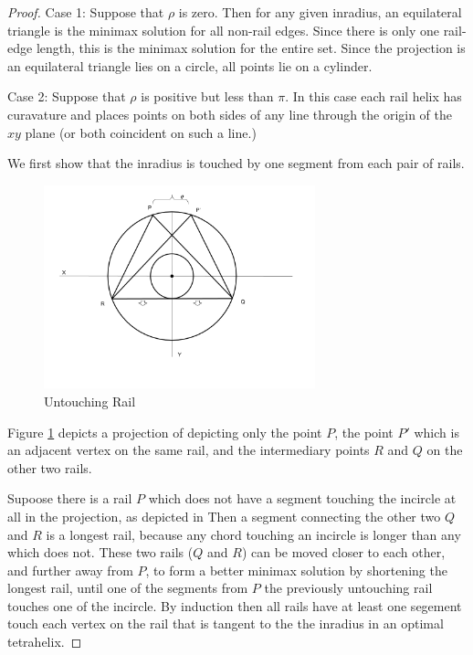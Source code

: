 \documentclass[11pt]{article}
\begin{document}
\begin{proof}



Case 1: Suppose that $\rho$ is zero. Then for any given inradius, an equilateral
triangle is the minimax solution for all non-rail edges. Since there is only
one rail-edge length, this is the minimax solution for the entire set. Since
the projection is an equilateral triangle lies on a circle, all points lie on
a cylinder.

Case 2: Suppose that $\rho$ is positive but less than $\pi$.
In this case each rail helix has
curavature and places points on both sides of any line through the origin
of the $xy$ plane (or both coincident on such a line.)

We first show that the inradius is touched by one segment from each pair
of rails.

\begin{figure}[H]
  \label{untouchingrailfig}
     \centering
     \includegraphics[width=0.7\textwidth]{figures/UntouchingRail.png}
     \caption{Untouching Rail}
\end{figure}

Figure \ref{untouchingrailfig} depicts a projection of
depicting only the point $P$, the point $P'$ which is an adjacent vertex on the same rail,
and the intermediary points $R$ and $Q$ on the other two rails.

Supoose there is a rail $P$ which does not have a segment touching the incircle
at all in the projection, as depicted in 
Then a segment connecting the other two $Q$ and $R$ is a longest
rail, because any chord touching an incircle is longer than any which does not.
These two rails ($Q$ and $R$) can be moved closer to each other, and further away from $P$, to form a better minimax solution
by shortening the longest rail, until one of the segments from $P$ the previously
untouching rail touches one of the incircle. By induction then all rails have
at least one segement touch each vertex on the rail that is tangent to the
the inradius in an optimal tetrahelix.


\end{proof}
\end{document}
